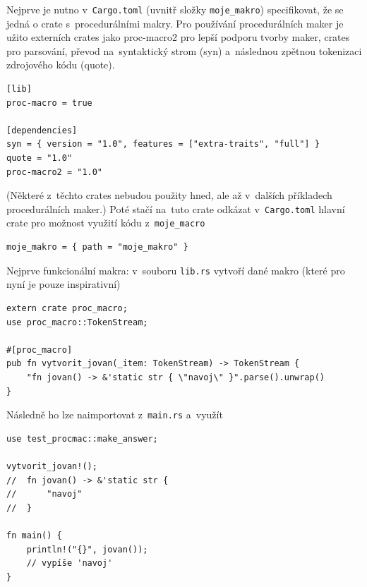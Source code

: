 \documentclass[a4paper, 12pt]{article} %
\begin{document}
			Nejprve je nutno v~\texttt{Cargo.toml} (uvnitř složky \texttt{moje\_makro}) specifikovat, že se jedná o crate s~procedurálními makry. Pro používání procedurálních maker je užito externích crates jako proc-macro2 pro lepší podporu tvorby maker, crates pro parsování, převod na~syntaktický strom (syn) a~následnou zpětnou tokenizaci zdrojového kódu (quote).
			\begin{verbatim}
[lib]
proc-macro = true

[dependencies]
syn = { version = "1.0", features = ["extra-traits", "full"] }
quote = "1.0"
proc-macro2 = "1.0"
			\end{verbatim}
			
			(Některé z~těchto crates nebudou použity hned, ale až v~dalších příkladech procedurálních maker.) Poté stačí na~tuto crate odkázat v~\texttt{Cargo.toml} hlavní crate pro možnost využití kódu z~\texttt{moje\_macro}
			\begin{verbatim}
moje_makro = { path = "moje_makro" }
			\end{verbatim}

			Nejprve funkcionální makra: v~souboru \texttt{lib.rs} vytvoří dané makro (které pro nyní je pouze inspirativní)
				\begin{verbatim}
extern crate proc_macro;
use proc_macro::TokenStream;

#[proc_macro]
pub fn vytvorit_jovan(_item: TokenStream) -> TokenStream {
	"fn jovan() -> &'static str { \"navoj\" }".parse().unwrap()
}
			\end{verbatim}
				
			Následně ho lze naimportovat z~\texttt{main.rs} a~využít
			\begin{verbatim}
use test_procmac::make_answer;

vytvorit_jovan!();
//  fn jovan() -> &'static str {
//      "navoj"
//  }

fn main() {
	println!("{}", jovan());
	// vypíše 'navoj'
}
			\end{verbatim}
			\cite{fcialni_proc}
				
\end{document}
